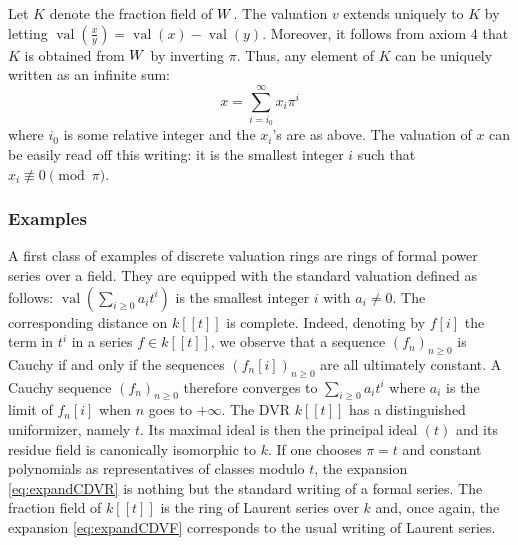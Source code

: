\documentclass{article}
\DeclareMathOperator{\val}{val}
\begin{document}
Let $K$ denote the fraction field of $W$. The valuation $v$ extends 
uniquely to $K$ by letting $\val(\frac x y) = \val(x) - \val(y)$. 
Moreover, it follows from axiom 4 that $K$ is obtained from $W$ by 
inverting $\pi$. Thus, any element of $K$ can be uniquely written as an 
infinite sum:
\begin{equation}
\label{eq:expandCDVF}
x = \sum_{i=i_0}^\infty x_i \pi^i
\end{equation}
where $i_0$ is some relative integer and the $x_i$'s are as above. The 
valuation of $x$ can be easily read off this writing: it is the smallest 
integer $i$ such that $x_i \not\equiv 0 \pmod \pi$.

\subsubsection{Examples}

A first class of examples of discrete valuation rings 
are rings of formal power series over a field. They are equipped with 
the standard valuation defined as follows: $\val(\sum_{i \geq 0} a_i 
t^i)$ is the smallest integer $i$ with $a_i \neq 0$. The corresponding 
distance on $k[[t]]$ is complete. Indeed, denoting by $f[i]$ the term in 
$t^i$ in a series $f \in k[[t]]$, we observe that a sequence $(f_n)_{n 
\geq 0}$ is Cauchy if and only if the sequences $(f_n[i])_{n \geq 0}$ 
are all ultimately constant. A Cauchy sequence $(f_n)_{n \geq 0}$ 
therefore converges to $\sum_{i \geq 0} a_i t^i$ where $a_i$ is the 
limit of $f_n[i]$ when $n$ goes to $+\infty$.
The DVR $k[[t]]$ has a distinguished uniformizer, namely $t$. Its 
maximal ideal is then the principal ideal $(t)$ and its residue field
is canonically isomorphic to $k$. 
If one chooses $\pi = t$ and constant polynomials as representatives of 
classes modulo $t$, the expansion \eqref{eq:expandCDVR} is nothing but 
the standard writing of a formal series.
The fraction field of $k[[t]]$ is the ring of Laurent series over $k$
and, once again, the expansion \eqref{eq:expandCDVF} corresponds to the
usual writing of Laurent series.

\medskip
\end{document}
